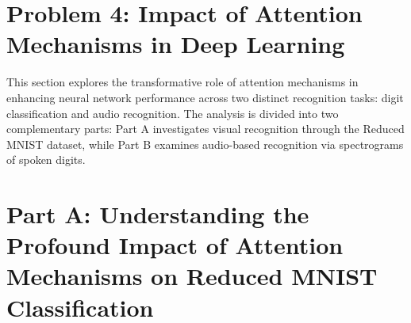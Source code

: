 \documentclass[12pt]{article}
\begin{document}
\section{Problem 4: Impact of Attention Mechanisms in Deep Learning}

This section explores the transformative role of attention mechanisms in enhancing neural network performance across two distinct recognition tasks: digit classification and audio recognition. The analysis is divided into two complementary parts: Part A investigates visual recognition through the Reduced MNIST dataset, while Part B examines audio-based recognition via spectrograms of spoken digits. 

\section{Part A: Understanding the Profound Impact of Attention Mechanisms on Reduced MNIST Classification}
\end{document}
